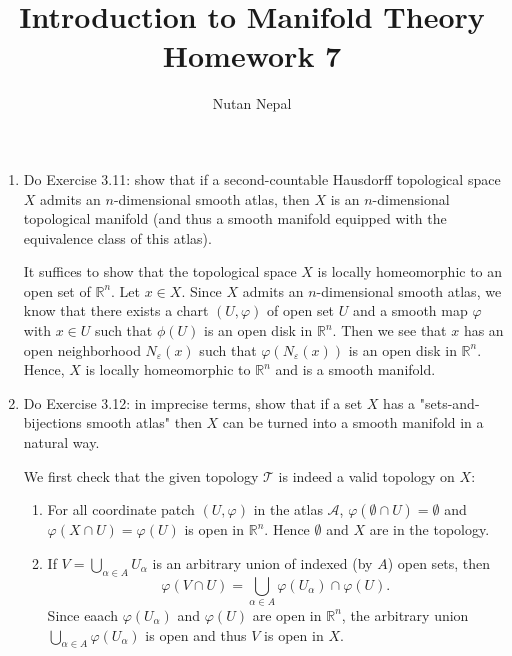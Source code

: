 \documentclass[12pt]{article}
\title{\textbf{Introduction to Manifold Theory} \\
\large Homework 7
}
\author{Nutan Nepal}
\newcommand{\rl}{\mathbb{R}}
\begin{document}
\maketitle
\makebox[\linewidth]{\rule{200mm}{1pt}}
\vspace{1mm}

\begin{enumerate}

\item Do Exercise 3.11: show that if a second-countable
    Hausdorff topological space $X$ admits an
    $n$-dimensional smooth atlas, then $X$ is an
    $n$-dimensional topological manifold
    (and thus a smooth manifold equipped with the
    equivalence class of this atlas).

\begin{mybox}

    It suffices to show that the topological space $X$ is
    locally homeomorphic to an open set of $\rl^n$. Let
    $x\in X$. Since $X$ admits an $n$-dimensional smooth
    atlas, we know that there exists a chart $(U,\varphi)$
    of open set $U$ and a smooth map $\varphi$
    with $x\in U$ such that $\phi(U)$ is an open disk
    in $\rl^n$. Then we see that $x$ has an open
    neighborhood $N_\varepsilon(x)$ such that
    $\varphi(N_\varepsilon(x))$ is an open disk in $\rl^n$.
    Hence, $X$ is locally homeomorphic to $\rl^n$ and is
    a smooth manifold.

\end{mybox}


\item Do Exercise 3.12: in imprecise terms,
    show that if a set $X$ has a "sets-and-bijections
    smooth atlas" then $X$ can be turned into a smooth
    manifold in a natural way.
 
\begin{mybox}

    We first check that the given topology $\mathscr{T}$
    is indeed a valid topology on $X$:

    \vspace*{2mm}
    \begin{enumerate}
        \item For all coordinate patch $(U,\varphi)$ in the
        atlas $\mathcal{A}$, $\varphi(\emptyset\cap U)
        =\emptyset$ and $\varphi(X\cap U)=\varphi(U)$ is open
        in $\rl^n$. Hence $\emptyset$ and $X$ are in the
        topology.

        \item If $V=\bigcup_{\alpha\in A}{U_\alpha}$ is an 
        arbitrary union of indexed (by $A$) open sets, then 
        $$\varphi(V\cap U)=\bigcup_{\alpha\in A}
        {\varphi(U_\alpha)}\cap \varphi(U).$$
        Since eaach $\varphi(U_\alpha)$ and
        $\varphi(U)$ are open in $\rl^n$,
        the arbitrary union $\bigcup_{\alpha\in A}
        {\varphi(U_\alpha)}$ is open and thus $V$ is open
        in $X$.


\end{enumerate}
\end{mybox}
\end{enumerate}
\end{document}
